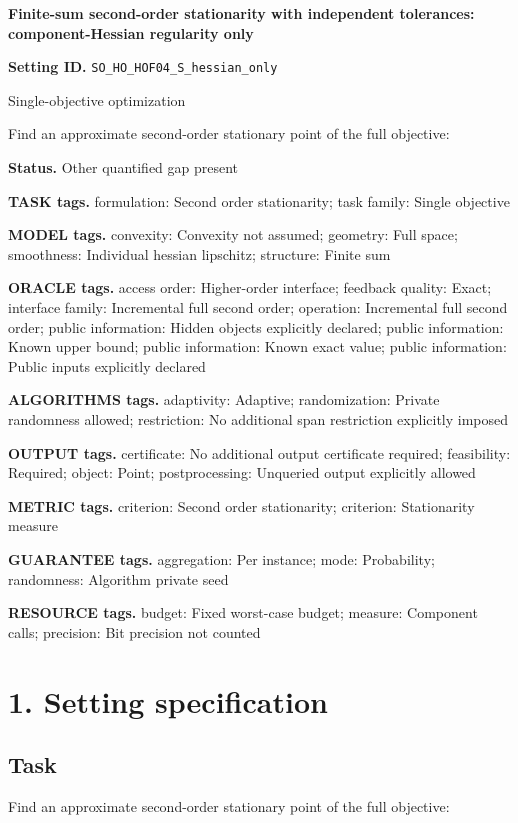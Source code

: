 \documentclass[10pt,a4paper]{article}
\begin{document}
\raggedright

{\LARGE\bfseries\sffamily\color{AtlasNavy} Finite-sum second-order stationarity with independent tolerances: component-Hessian regularity only\par}\vspace{5pt}
\textbf{Setting ID.} \texttt{SO\_\allowbreak{}HO\_\allowbreak{}HOF04\_\allowbreak{}S\_\allowbreak{}hessian\_\allowbreak{}only}

Single-objective optimization

Find an approximate second-order stationary point of the full objective:

\textbf{Status.} Other quantified gap present

\textbf{TASK tags.} formulation: Second order stationarity; task family: Single objective

\textbf{MODEL tags.} convexity: Convexity not assumed; geometry: Full space; smoothness: Individual hessian lipschitz; structure: Finite sum

\textbf{ORACLE tags.} access order: Higher-order interface; feedback quality: Exact; interface family: Incremental full second order; operation: Incremental full second order; public information: Hidden objects explicitly declared; public information: Known upper bound; public information: Known exact value; public information: Public inputs explicitly declared

\textbf{ALGORITHMS tags.} adaptivity: Adaptive; randomization: Private randomness allowed; restriction: No additional span restriction explicitly imposed

\textbf{OUTPUT tags.} certificate: No additional output certificate required; feasibility: Required; object: Point; postprocessing: Unqueried output explicitly allowed

\textbf{METRIC tags.} criterion: Second order stationarity; criterion: Stationarity measure

\textbf{GUARANTEE tags.} aggregation: Per instance; mode: Probability; randomness: Algorithm private seed

\textbf{RESOURCE tags.} budget: Fixed worst-case budget; measure: Component calls; precision: Bit precision not counted

\section{1. Setting specification}
\subsection{Task}
Find an approximate second-order stationary point of the full objective:
\end{document}
